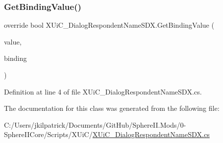 \subsubsection{\texorpdfstring{GetBindingValue()}{GetBindingValue()}}
{\footnotesize\ttfamily override bool X\+Ui\+C\+\_\+\+Dialog\+Respondent\+Name\+S\+D\+X.\+Get\+Binding\+Value (\begin{DoxyParamCaption}\item[{ref string}]{value,  }\item[{Binding\+Item}]{binding }\end{DoxyParamCaption})}



Definition at line 4 of file X\+Ui\+C\+\_\+\+Dialog\+Respondent\+Name\+S\+D\+X.\+cs.



The documentation for this class was generated from the following file\+:\begin{DoxyCompactItemize}
\item 
C\+:/\+Users/jkilpatrick/\+Documents/\+Git\+Hub/\+Sphere\+I\+I.\+Mods/0-\/\+Sphere\+I\+I\+Core/\+Scripts/\+X\+Ui\+C/\mbox{\hyperlink{_x_ui_c___dialog_respondent_name_s_d_x_8cs}{X\+Ui\+C\+\_\+\+Dialog\+Respondent\+Name\+S\+D\+X.\+cs}}\end{DoxyCompactItemize}
